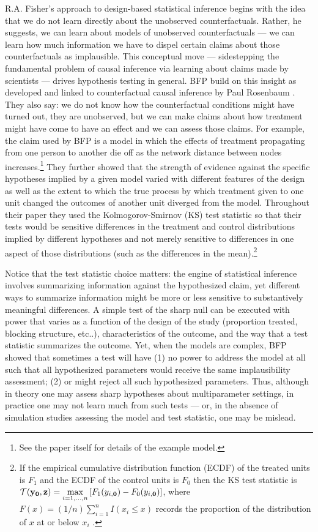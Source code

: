 R.A. Fisher's approach to design-based statistical inference  \citep[Chap
2]{fisher:1935} begins with the idea that we do not learn directly about the
unobserved counterfactuals. Rather, he suggests, we can learn about models of
unobserved counterfactuals --- we can learn how much information we have to
dispel certain claims about those counterfactuals as implausible. This
conceptual move --- sidestepping the fundamental problem of causal inference
via learning about claims made by scientists --- drives hypothesis testing in
general.  BFP build on this insight as developed and
linked to counterfactual causal inference by Paul Rosenbaum
\citep{rosenbaum2010design}. They also say: we do not know how the
counterfactual conditions might have turned out, they are unobserved, but we
can make claims about how treatment might have come to have an effect and we
can assess those claims. For example, the claim used by
BFP is a model in which the effects of treatment
propagating from one person to another die off as the network distance between
nodes increases.\footnote{See the paper itself for details of the example
  model.} They further showed that the strength of evidence against the
specific hypotheses implied by a given model varied with different features of
the design as well as the extent to which the true process by which treatment
given to one unit changed the outcomes of another unit diverged from the
model. Throughout their paper they used the Kolmogorov-Smirnov (KS) test
statistic so that their tests would be sensitive differences in the treatment
and control distributions implied by different hypotheses and not merely
sensitive to differences in one aspect of those distributions (such as the
differences in the mean).\footnote{If the empirical cumulative distribution
  function (ECDF) of the treated units is $F_1$ and the ECDF of the control
  units is $F_0$ then the KS test statistic is $\mathcal{T}(\mathbf{y}_{\mathbf{0}},\mathbf{z}) = \underset{i =
    1,\ldots,n}{\text{max}}\left[F_1(y_{i,\mathbf{0}}) -
    F_0(y_{i,\mathbf{0}})\right]$, where $F(x)=(1/n)\sum_{i=1}^n I(x_i \le x)$
  records the proportion of the distribution of $x$ at or below $x_i$
  \citep[\S 5.4]{MylesHollander1999a}.}

Notice that the test statistic choice matters: the engine of statistical
inference involves summarizing information against the hypothesized claim, yet
different ways to summarize information might be more or less sensitive to
substantively meaningful differences. A simple test of the
sharp null can be executed with power that varies as a function of the design
of the study (proportion treated, blocking structure, etc..), characteristics
of the outcome, and the way that a test statistic summarizes the outcome. Yet,
when the models are complex,  BFP showed that sometimes a
test will have (1) no power to address the model at all such that all hypothesized parameters
would receive the same implausibility assessment; (2) or might reject all such
hypothesized parameters. Thus, although in theory one may assess sharp
hypotheses about multiparameter settings, in practice one may not learn much
from such tests --- or, in the absence of simulation studies assessing the
model and test statistic, one may be mislead.

